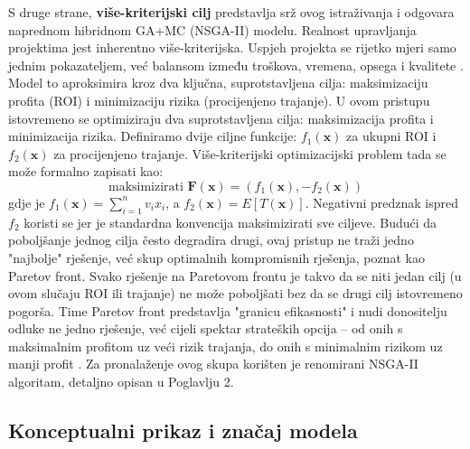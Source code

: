 S druge strane, \textbf{više-kriterijski cilj} predstavlja srž ovog istraživanja i odgovara naprednom hibridnom GA+MC (NSGA-II) modelu. Realnost upravljanja projektima jest inherentno više-kriterijska. Uspjeh projekta se rijetko mjeri samo jednim pokazateljem, već balansom između troškova, vremena, opsega i kvalitete \cite{PMI2021}. Model to aproksimira kroz dva ključna, suprotstavljena cilja: maksimizaciju profita (ROI) i minimizaciju rizika (procijenjeno trajanje). U ovom pristupu istovremeno se optimiziraju dva suprotstavljena cilja: maksimizacija profita i minimizacija rizika. Definiramo dvije ciljne funkcije: $f_1(\mathbf{x})$ za ukupni ROI i $f_2(\mathbf{x})$ za procijenjeno trajanje. Više-kriterijski optimizacijski problem tada se može formalno zapisati kao:
$$ \text{maksimizirati } \mathbf{F}(\mathbf{x}) = (f_1(\mathbf{x}), -f_2(\mathbf{x})) $$
gdje je $f_1(\mathbf{x})=\sum_{i=1}^n v_i x_i$, a $f_2(\mathbf{x})=E[T(\mathbf{x})]$.
Negativni predznak ispred $f_2$ koristi se jer je standardna konvencija maksimizirati sve ciljeve. Budući da poboljšanje jednog cilja često degradira drugi, ovaj pristup ne traži jedno "najbolje" rješenje, već skup optimalnih kompromisnih rješenja, poznat kao Paretov front. Svako rješenje na Paretovom frontu je takvo da se niti jedan cilj (u ovom slučaju ROI ili trajanje) ne može poboljšati bez da se drugi cilj istovremeno pogorša. Time Paretov front predstavlja "granicu efikasnosti" i nudi donositelju odluke ne jedno rješenje, već cijeli spektar strateških opcija – od onih s maksimalnim profitom uz veći rizik trajanja, do onih s minimalnim rizikom uz manji profit \cite{Deb2002, Goldberg1989}. Za pronalaženje ovog skupa korišten je renomirani NSGA-II algoritam, detaljno opisan u Poglavlju 2.
\subsection{Konceptualni prikaz i značaj modela}

